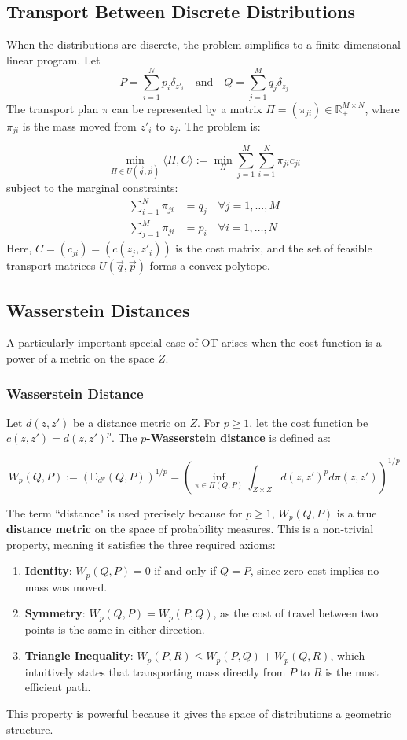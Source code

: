 \documentclass[12pt]{report}
\newcommand{\coloneqq}{\mathrel{:=}}
\begin{document}
\subsection{Transport Between Discrete Distributions}

When the distributions are discrete, the problem simplifies to a finite-dimensional linear program. Let
\[
P = \sum_{i=1}^N p_i \delta_{z'_i} \quad \text{and} \quad Q = \sum_{j=1}^M q_j \delta_{z_j}
\]
The transport plan $\pi$ can be represented by a matrix $\Pi = (\pi_{ji}) \in \mathbb{R}_+^{M \times N}$, where $\pi_{ji}$ is the mass moved from $z'_i$ to $z_j$. The problem is:

\[
\min_{\Pi \in U(\vec{q}, \vec{p})} \langle \Pi, C \rangle \coloneqq \min_{\Pi} \sum_{j=1}^M \sum_{i=1}^N \pi_{ji} c_{ji}
\]
subject to the marginal constraints:
\begin{align*}
\sum_{i=1}^N \pi_{ji} &= q_j \quad \forall j=1,\dots,M \\
\sum_{j=1}^M \pi_{ji} &= p_i \quad \forall i=1,\dots,N
\end{align*}
Here, $C = (c_{ji}) = (c(z_j, z'_i))$ is the cost matrix, and the set of feasible transport matrices $U(\vec{q}, \vec{p})$ forms a convex polytope.

\subsection{Wasserstein Distances}
A particularly important special case of OT arises when the cost function is a power of a metric on the space $Z$.

\subsubsection*{Wasserstein Distance}
Let $d(z, z')$ be a distance metric on $Z$. For $p \ge 1$, let the cost function be $c(z, z') = d(z, z')^p$. The \textbf{$p$-Wasserstein distance} is defined as:

\[
W_p(Q, P) \coloneqq \left( \mathbb{D}_{d^p}(Q, P) \right)^{1/p} = \left( \inf_{\pi \in \Pi(Q, P)} \int_{Z \times Z} d(z, z')^p d\pi(z, z') \right)^{1/p}
\]

The term ``distance" is used precisely because for $p \ge 1$, $W_p(Q, P)$ is a true \textbf{distance metric} on the space of probability measures. 
This is a non-trivial property, meaning it satisfies the three required axioms:
\begin{enumerate}
    \item \textbf{Identity}: $W_p(Q, P) = 0$ if and only if $Q = P$, since zero cost implies no mass was moved.
    \item \textbf{Symmetry}: $W_p(Q, P) = W_p(P, Q)$, as the cost of travel between two points is the same in either direction.
    \item \textbf{Triangle Inequality}: $W_p(P, R) \le W_p(P, Q) + W_p(Q, R)$, which intuitively states that transporting mass directly from $P$ to $R$ is the most efficient path.
\end{enumerate} 
This property is powerful because it gives the space of distributions a geometric structure.
\end{document}
